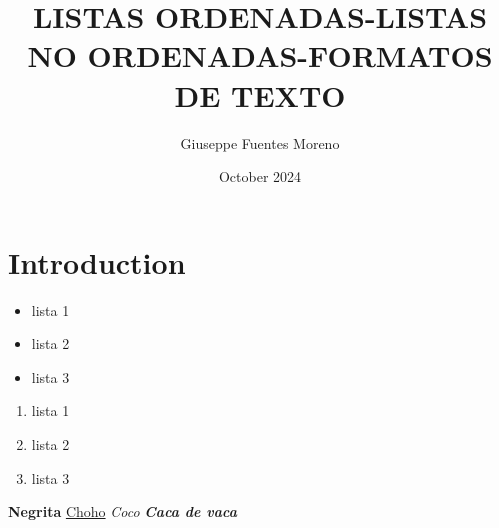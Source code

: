 \documentclass{article}
\title{LISTAS ORDENADAS-LISTAS NO ORDENADAS-FORMATOS DE TEXTO}
\author{Giuseppe Fuentes Moreno}
\date{October 2024}
\begin{document}
\maketitle

\section{Introduction}
\begin{itemize}
    \item lista 1
    \item lista 2
    \item lista 3
\end{itemize}
\begin{enumerate}
    \item lista 1
    \item lista 2
    \item lista 3
\end{enumerate}

\textbf{Negrita} %
\underline{Choho} %
\emph{Coco} %
\textbf{\emph{Caca de vaca}} %
\end{document}
